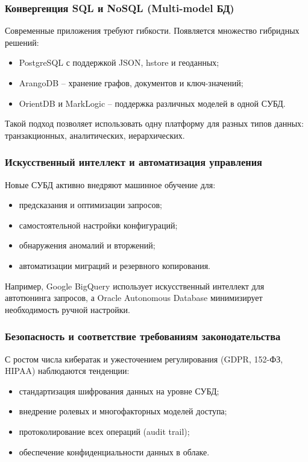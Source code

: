 \subsubsection{Конвергенция SQL и NoSQL (Multi-model БД)}

Современные приложения требуют гибкости. Появляется множество гибридных решений:
\begin{itemize}
	\item PostgreSQL с поддержкой JSON, hstore и геоданных;
	\item ArangoDB -- хранение графов, документов и ключ-значений;
	\item OrientDB и MarkLogic -- поддержка различных моделей в одной СУБД.
\end{itemize}

Такой подход позволяет использовать одну платформу для разных типов данных: транзакционных, аналитических, иерархических.

\subsubsection{Искусственный интеллект и автоматизация управления}

Новые СУБД активно внедряют машинное обучение для:
\begin{itemize}
	\item предсказания и оптимизации запросов;
	\item самостоятельной настройки конфигураций;
	\item обнаружения аномалий и вторжений;
	\item автоматизации миграций и резервного копирования.
\end{itemize}

Например, Google BigQuery использует искусственный интеллект для автотюнинга запросов, а Oracle Autonomous Database минимизирует необходимость ручной настройки.

\subsubsection{Безопасность и соответствие требованиям законодательства}

С ростом числа кибератак и ужесточением регулирования (GDPR, 152-ФЗ, HIPAA) наблюдаются тенденции:
\begin{itemize}
	\item стандартизация шифрования данных на уровне СУБД;
	\item внедрение ролевых и многофакторных моделей доступа;
	\item протоколирование всех операций (audit trail);
	\item обеспечение конфиденциальности данных в облаке.
\end{itemize}


